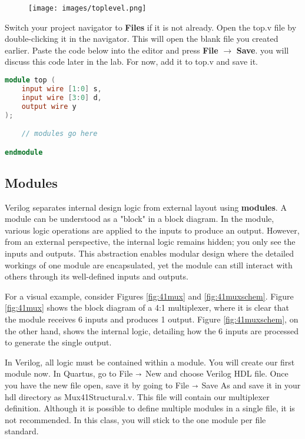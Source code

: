 \documentclass[12pt]{journal}
\begin{document}
\begin{figure}[H]
    \centering
    \texttt{[image: images/toplevel.png]}
\end{figure}


Switch your project navigator to \textbf{Files} if it is not already. Open the top.v file by double-clicking it in the navigator. This will open the blank file you created earlier. Paste the code below into the editor and press \textbf{File} $\longrightarrow$ \textbf{Save}. you will discuss this code later in the lab. For now, add it to top.v and save it.

\begin{lstlisting}[language=verilog]
module top (
    input wire [1:0] s,
    input wire [3:0] d,
    output wire y
);

    // modules go here

endmodule
\end{lstlisting}

\subsection{Modules}
Verilog separates internal design logic from external layout using \textbf{modules}. A module can be understood as a "block" in a block diagram. In the module, various logic operations are applied to the inputs to produce an output. However, from an external perspective, the internal logic remains hidden; you only see the inputs and outputs. This abstraction enables modular design where the detailed workings of one module are encapsulated, yet the module can still interact with others through its well-defined inputs and outputs.

For a visual example, consider Figures \ref{fig:41mux} and \ref{fig:41muxschem}. Figure \ref{fig:41mux} shows the block diagram of a 4:1 multiplexer, where it is clear that the module receives 6 inputs and produces 1 output. Figure \ref{fig:41muxschem}, on the other hand, shows the internal logic, detailing how the 6 inputs are processed to generate the single output.

In Verilog, all logic must be contained within a module. You will create our first module now. In Quartus, go to File $\shortrightarrow$ New and choose Verilog HDL file. Once you have the new file open, save it by going to File $\shortrightarrow$ Save As and save it in your hdl directory as Mux41Structural.v. This file will contain our multiplexer definition. Although it is possible to define multiple modules in a single file, it is not recommended. In this class, you will stick to the one module per file standard.
\end{document}

